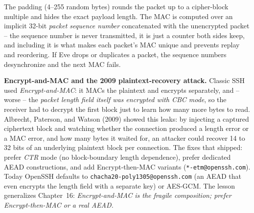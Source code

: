 The padding (4--255 random bytes) rounds the packet up to a cipher-block multiple and hides the exact payload length. The MAC is computed over an implicit 32-bit \emph{packet sequence number} concatenated with the unencrypted packet -- the sequence number is never transmitted, it is just a counter both sides keep, and including it is what makes each packet's MAC unique and prevents replay and reordering. If Eve drops or duplicates a packet, the sequence numbers desynchronize and the next MAC fails.

\begin{attackbox}
\textbf{Encrypt-and-MAC and the 2009 plaintext-recovery attack.} Classic SSH used \emph{Encrypt-and-MAC}: it MACs the plaintext and encrypts separately, and -- worse -- the \emph{packet length field itself was encrypted with CBC mode}, so the receiver had to decrypt the first block just to learn how many more bytes to read. Albrecht, Paterson, and Watson (2009) showed this leaks: by injecting a captured ciphertext block and watching whether the connection produced a length error or a MAC error, and how many bytes it waited for, an attacker could recover 14 to 32 bits of an underlying plaintext block per connection. The fixes that shipped: prefer \emph{CTR} mode (no block-boundary length dependence), prefer dedicated AEAD constructions, and add Encrypt-then-MAC variants (\texttt{*-etm@openssh.com}). Today OpenSSH defaults to \texttt{chacha20-poly1305@openssh.com} (an AEAD that even encrypts the length field with a separate key) or AES-GCM. The lesson generalizes Chapter~16: \emph{Encrypt-and-MAC is the fragile composition; prefer Encrypt-then-MAC or a real AEAD.}
\end{attackbox}

